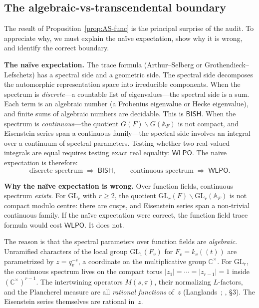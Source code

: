 \documentclass[11pt]{article}
\theoremstyle{plain}
\theoremstyle{definition}
\theoremstyle{remark}
\newcommand{\C}{\mathbb{C}}
\newcommand{\A}{\mathbb{A}}
\newcommand{\GL}{\mathrm{GL}}
\newcommand{\BISH}{\mathsf{BISH}}
\newcommand{\WLPO}{\mathsf{WLPO}}
\begin{document}
\subsection{The algebraic-vs-transcendental boundary}\label{sec:boundary}

The result of Proposition~\ref{prop:AS-func} is the principal surprise of the
audit. To appreciate why, we must explain the na\"ive expectation, show why it
is wrong, and identify the correct boundary.

\medskip\noindent
\textbf{The na\"ive expectation.}
The trace formula (Arthur--Selberg or Grothendieck--Lefschetz) has a spectral
side and a geometric side. The spectral side decomposes the automorphic
representation space into irreducible components. When the spectrum is
\emph{discrete}---a countable list of eigenvalues---the spectral side is a
sum. Each term is an algebraic number (a Frobenius eigenvalue or Hecke
eigenvalue), and finite sums of algebraic numbers are decidable. This is
$\BISH$. When the spectrum is \emph{continuous}---the quotient
$G(F) \backslash G(\A_F)$ is not compact, and Eisenstein series span a
continuous family---the spectral side involves an integral over a continuum of
spectral parameters. Testing whether two real-valued integrals are equal
requires testing exact real equality: $\WLPO$. The na\"ive expectation is
therefore:
\[
\text{discrete spectrum} \;\Rightarrow\; \BISH, \qquad
\text{continuous spectrum} \;\Rightarrow\; \WLPO.
\]

\medskip\noindent
\textbf{Why the na\"ive expectation is wrong.}
Over function fields, continuous spectrum \emph{exists}. For $\GL_r$ with
$r \ge 2$, the quotient $\GL_r(F) \backslash \GL_r(\A_F)$ is not compact
modulo centre: there are cusps, and Eisenstein series span a non-trivial
continuous family. If the na\"ive expectation were correct, the function field
trace formula would cost $\WLPO$. It does not.

The reason is that the spectral parameters over function fields are
\emph{algebraic}. Unramified characters of the local group $\GL_1(F_v)$ for
$F_v = k_v((t))$ are parametrized by $z = q_v^{-s}$, a coordinate on the
multiplicative group $\C^\times$. For $\GL_r$, the continuous spectrum lives on
the compact torus $|z_1| = \cdots = |z_{r-1}| = 1$ inside
$(\C^\times)^{r-1}$. The intertwining operators $M(s,\pi)$, their normalizing
$L$-factors, and the Plancherel measure are all \emph{rational functions}
of~$z$ (Langlands~\cite{Langlands71}; \cite{Laumon00}, \S3). The Eisenstein
series themselves are rational in~$z$.
\end{document}
